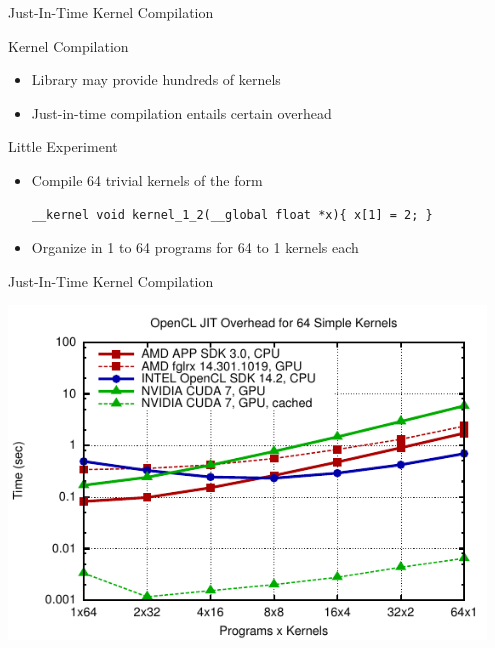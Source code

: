 


\begin{frame}[fragile]{Just-In-Time Kernel Compilation}

 \begin{block}{Kernel Compilation}
   \begin{itemize}
    \item Library may provide hundreds of kernels
    \item Just-in-time compilation entails certain overhead
   \end{itemize}
 \end{block}

 \begin{block}{Little Experiment}
  \begin{itemize}
   \item Compile 64 trivial kernels of the form
   \begin{lstlisting}
__kernel void kernel_1_2(__global float *x){ x[1] = 2; }
   \end{lstlisting}
   \item Organize in 1 to 64 programs for 64 to 1 kernels each
  \end{itemize}
 \end{block}
 
\end{frame}




\begin{frame}{Just-In-Time Kernel Compilation}
\begin{center}
 \includegraphics[width=0.95\textwidth]{figures/jit-overhead-5}
\end{center}
\end{frame}


